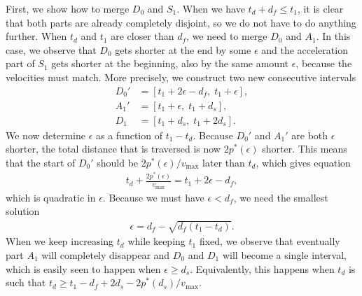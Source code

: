 \documentclass[a4paper]{article}
\theoremstyle{definition}
\theoremstyle{plain}
\begin{document}
First, we show how to merge $D_{0}$ and $S_{1}$.
When we have $t_{d} + d_{f} \leq t_{1}$, it is clear that both parts are already
completely disjoint, so we do not have to do anything further.
When $t_{d}$ and $t_{1}$ are closer than $d_{f}$, we need to merge $D_{0}$
and $A_{1}$. In this case, we observe that $D_{0}$ gets shorter
at the end by some $\epsilon$ and the acceleration part of $S_{1}$ gets shorter at the
beginning, also by the same amount $\epsilon$, because the velocities must match. More
precisely, we construct two new consecutive intervals
\begin{align*}
  D_{0}' &= [t_{1} + 2 \epsilon - d_{f}, \; t_{1} + \epsilon] , \\
  A_{1}' &= [t_{1} + \epsilon,   \; t_{1} + d_{s}],  \\
  D_{1}  &= [t_{1} + d_{s},      \; t_{1} + 2 d_{s}] .
\end{align*}
%
We now determine $\epsilon$ as a function of $t_{1} - t_{d}$.
%
Because $D_{0}'$ and $A_{1}'$ are both $\epsilon$ shorter, the total distance
that is traversed is now $2 p^{*}(\epsilon)$ shorter. This means that the start
of $D_{0}'$ should be $2 p^{*}(\epsilon) / v_{\max}$ later than $t_{d}$, which
gives equation
\begin{align*}
  t_{d} + \frac{2 p^{*}(\epsilon)}{v_{\max}}  = t_{1} + 2\epsilon - d_{f} ,
\end{align*}
which is quadratic in $\epsilon$. Because we must have $\epsilon < d_{f}$, we need the
smallest solution
\begin{align*}
  \epsilon = d_{f} - \sqrt{d_{f} (t_{1} - t_{d})} .
\end{align*}
When we keep increasing $t_{d}$ while keeping $t_{1}$ fixed, we observe that
eventually part $A_{1}$ will completely disappear and $D_{0}$ and $D_{1}$ will
become a single interval, which is easily seen to happen when $\epsilon \geq d_{s}$.
Equivalently, this happens when $t_{d}$ is such that
$t_{d} \geq t_{1} - d_{f} + 2 d_{s} - 2p^{*}(d_{s}) / v_{\max}$.
\end{document}
